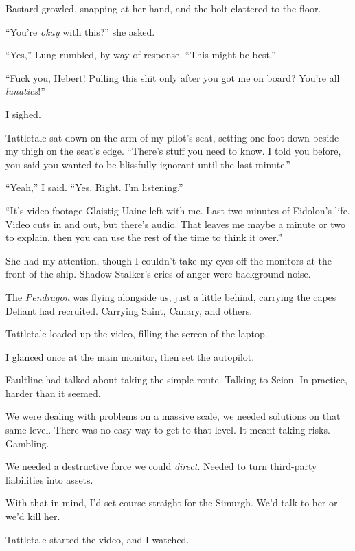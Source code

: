 Bastard growled, snapping at her hand, and the bolt clattered to the floor.



``You're \emph{okay} with this?''  she asked.



``Yes,'' Lung rumbled, by way of response.  ``This might be best.''



``Fuck you, Hebert!  Pulling this shit only after you got me on board?  You're all \emph{lunatics}!''



I sighed.



Tattletale sat down on the arm of my pilot's seat, setting one foot down beside my thigh on the seat's edge.  ``There's stuff you need to know.  I told you before, you said you wanted to be blissfully ignorant until the last minute.''



``Yeah,'' I said.  ``Yes.  Right.  I'm listening.''



``It's video footage Glaistig Uaine left with me.  Last two minutes of Eidolon's life.  Video cuts in and out, but there's audio.  That leaves me maybe a minute or two to explain, then you can use the rest of the time to think it over.''



She had my attention, though I couldn't take my eyes off the monitors at the front of the ship.  Shadow Stalker's cries of anger were background noise.



The \emph{Pendragon} was flying alongside us, just a little behind, carrying the capes Defiant had recruited.  Carrying Saint, Canary, and others.



Tattletale loaded up the video, filling the screen of the laptop.



I glanced once at the main monitor, then set the autopilot.



Faultline had talked about taking the simple route.  Talking to Scion.  In practice, harder than it seemed.



We were dealing with problems on a massive scale, we needed solutions on that same level.  There was no easy way to get to that level.  It meant taking risks.  Gambling.



We needed a destructive force we could \emph{direct}.  Needed to turn third-party liabilities into assets.



With that in mind, I'd set course straight for the Simurgh.  We'd talk to her or we'd kill her.



Tattletale started the video, and I watched.





